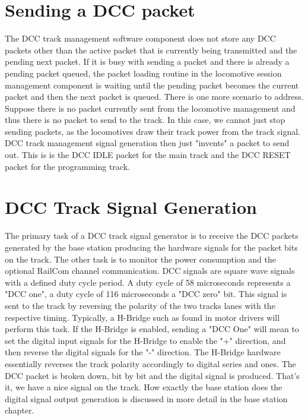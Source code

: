 \section{Sending a DCC packet}

The DCC track management software component does not store any DCC packets other than the active packet that is currently being transmitted and the pending next packet. If it is busy with sending a packet and there is already a pending packet queued, the packet loading routine in the locomotive session management component is waiting until the pending packet becomes the current packet and then the next packet is queued. There is one more scenario to address. Suppose there is no packet currently sent from the locomotive management and thus there is no packet to send to the track. In this case, we cannot just stop sending packets, as the locomotives draw their track power from the track signal. DCC track management signal generation then just "invents" a packet to send out. This is is the DCC IDLE packet for the main track and the DCC RESET packet for the programming track.

\section{DCC Track Signal Generation}

The primary task of a DCC track signal generator is to receive the DCC packets generated by the base station producing the hardware signals for the packet bits on the track. The other task is to monitor the power consumption and the optional RailCom channel communication. DCC signals are square wave signals with a defined duty cycle period. A duty cycle of 58 microseconds represents a "DCC one", a duty cycle of 116 microseconds a "DCC zero" bit. This signal is sent to the track by reversing the polarity of the two tracks lanes with the respective timing. Typically, a H-Bridge such as found in motor drivers will perform this task. If the H-Bridge is enabled, sending a "DCC One" will mean to set the digital input signals for the H-Bridge to enable the "+" direction, and then reverse the digital signals for the "-" direction. The H-Bridge hardware essentially reverses the track polarity accordingly to digital series and ones. The DCC packet is broken down, bit by bit and the digital signal is produced.  That's it, we have a nice signal on the track. How exactly the base station does the digital signal output generation is discussed in more detail in the base station chapter.

